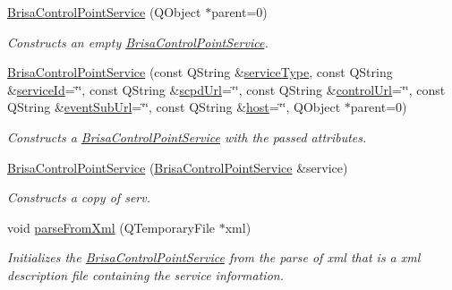 \begin{DoxyCompactItemize}
\item 
\hyperlink{classBrisaUpnp_1_1BrisaControlPointService_ae9ca99a1f186d2220cf1f52f2959715d}{BrisaControlPointService} (QObject $\ast$parent=0)
\begin{DoxyCompactList}\small\item\em Constructs an empty \hyperlink{classBrisaUpnp_1_1BrisaControlPointService}{BrisaControlPointService}. \item\end{DoxyCompactList}\item 
\hyperlink{classBrisaUpnp_1_1BrisaControlPointService_a9186e4623236b8780fdc687725d974bb}{BrisaControlPointService} (const QString \&\hyperlink{classBrisaUpnp_1_1BrisaAbstractService_a670933cc6c8581e2f70f52a97d425e4c}{serviceType}, const QString \&\hyperlink{classBrisaUpnp_1_1BrisaAbstractService_ad72b169651a6c617d27d51e7f706410d}{serviceId}=\char`\"{}\char`\"{}, const QString \&\hyperlink{classBrisaUpnp_1_1BrisaAbstractService_aa254b466f38b49b921ed7a25aea7cc8c}{scpdUrl}=\char`\"{}\char`\"{}, const QString \&\hyperlink{classBrisaUpnp_1_1BrisaAbstractService_acc5a45e07d8da5d8e086b02f4a22cc78}{controlUrl}=\char`\"{}\char`\"{}, const QString \&\hyperlink{classBrisaUpnp_1_1BrisaAbstractService_a81d2525c94d2b9572c962089c388f8f9}{eventSubUrl}=\char`\"{}\char`\"{}, const QString \&\hyperlink{classBrisaUpnp_1_1BrisaAbstractService_a9033d7f9255f3a1b6d3540258bf2ade1}{host}=\char`\"{}\char`\"{}, QObject $\ast$parent=0)
\begin{DoxyCompactList}\small\item\em Constructs a \hyperlink{classBrisaUpnp_1_1BrisaControlPointService}{BrisaControlPointService} with the passed attributes. \item\end{DoxyCompactList}\item 
\hyperlink{classBrisaUpnp_1_1BrisaControlPointService_a6781dbf8732326e4db39e3e4c1744855}{BrisaControlPointService} (\hyperlink{classBrisaUpnp_1_1BrisaControlPointService}{BrisaControlPointService} \&service)
\begin{DoxyCompactList}\small\item\em Constructs a copy of {\itshape serv\/}. \item\end{DoxyCompactList}\item 
void \hyperlink{classBrisaUpnp_1_1BrisaControlPointService_af24bbef6116b25cd4dfb3433d6b18199}{parseFromXml} (QTemporaryFile $\ast$xml)
\begin{DoxyCompactList}\small\item\em Initializes the \hyperlink{classBrisaUpnp_1_1BrisaControlPointService}{BrisaControlPointService} from the parse of {\itshape xml\/} that is a xml description file containing the service information. \item\end{DoxyCompactList}\item 

\end{DoxyCompactItemize}

